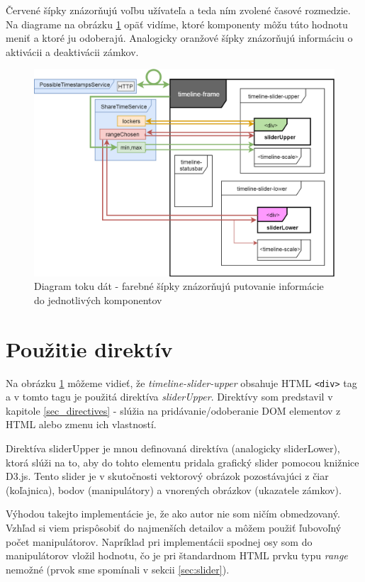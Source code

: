 \documentclass[
  digital, %
  twoside, %
  notable,   %
  nolof,   %
  nolot,   %
]{fithesis3}
\begin{document}
Červené šípky znázorňujú voľbu užívateľa a teda ním zvolené časové rozmedzie. Na diagrame na obrázku \ref{data_diagram} opäť vidíme, ktoré komponenty môžu túto hodnotu meniť a ktoré ju odoberajú. Analogicky oranžové šípky znázorňujú informáciu o aktivácii a deaktivácii zámkov.

\begin{figure}[H]
	\center
	\includegraphics[width=1.0\linewidth]{data_diagram}
	\caption{Diagram toku dát - farebné šípky znázorňujú putovanie informácie do jednotlivých komponentov}
	\label{data_diagram}
\end{figure}

\section{Použitie direktív}
Na obrázku \ref{data_diagram} môžeme vidieť, že \textit{timeline-slider-upper} obsahuje HTML \texttt{<div>} tag a v tomto tagu je použitá direktíva \textit{sliderUpper}. Direktívy som predstavil v kapitole \ref{sec_directives} - slúžia na pridávanie/odoberanie DOM elementov z HTML alebo zmenu ich vlastností.

Direktíva sliderUpper je mnou definovaná direktíva (analogicky sliderLower), ktorá slúži na to, aby do tohto elementu pridala grafický slider pomocou knižnice D3.js. Tento slider je v skutočnosti vektorový obrázok pozostávajúci z čiar (koľajnica), bodov (manipulátory) a vnorených obrázkov (ukazatele zámkov).

Výhodou takejto implementácie je, že ako autor nie som ničím obmedzovaný. Vzhľad si viem prispôsobiť do najmenších detailov a môžem použiť ľubovoľný počet manipulátorov. Napríklad pri implementácii spodnej osy som do manipulátorov vložil hodnotu, čo je pri štandardnom HTML prvku typu \textit{range} nemožné (prvok sme spomínali v sekcii \ref{sec:slider}).
\end{document}
